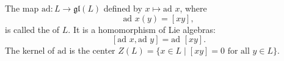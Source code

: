 The map $\text{ad}: L \rightarrow \mathfrak{gl}(L)$ defined by $x \mapsto \text{ad } x$, where
$$\text{ad } x(y) = [xy],$$
is called the  of $L$. It is a homomorphism of Lie algebras:
$$[\text{ad } x, \text{ad } y] = \text{ad }[xy].$$
The kernel of $\text{ad}$ is the center $Z(L) = \{x \in L \mid [xy] = 0 \text{ for all } y \in L\}$.
